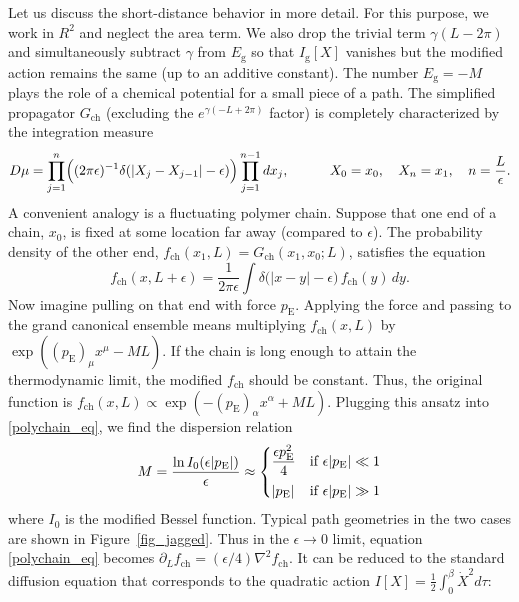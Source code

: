 \documentclass[11pt]{article}
\newcommand{\RR}{\mathbb{R}}
\newcommand{\ch}{\text{ch}}
\newcommand{\g}{\text{g}}
\newcommand{\Euc}{\mathrm{E}}
\def\RR{R}
\begin{document}
Let us discuss the short-distance behavior in more detail. For this purpose, we work in $\RR^2$ and neglect the area term. We also drop the trivial term $\gamma(L-2\pi)$ and simultaneously subtract $\gamma$ from $E_{\g}$ so that $I_{\g}[X]$ vanishes but the modified action remains the same (up to an additive constant). The number $E_{\g}=-M$ plays the role of a chemical potential for a small piece of a path. The simplified propagator $G_{\ch}$ (excluding the $e^{\gamma(-L+2\pi)}$ factor) is completely characterized by the integration measure
\begin{equation}
D\mu=\prod_{j=1}^{n}
\Bigl((2\pi\epsilon)^{-1}\delta(|X_{j}-X_{j-1}|-\epsilon)\Bigr)
\prod_{j=1}^{n-1}dx_j,\qquad\quad
X_0=x_0,\quad X_n=x_1,\quad n=\frac{L}{\epsilon}.
\end{equation}
A convenient analogy is a fluctuating polymer chain. Suppose that one end of a chain, $x_0$, is fixed at some location far away (compared to $\epsilon$). The probability density of the other end, $f_{\ch}(x_1,L)=G_{\ch}(x_1,x_0;L)$, satisfies the equation
\begin{equation}\label{polychain_eq}
f_{\ch}(x,L+\epsilon)=\frac{1}{2\pi\epsilon}
\int\delta\bigl(|x-y|-\epsilon\bigr)\,f_{\ch}(y)\,dy.
\end{equation}
Now imagine pulling on that end with force $p_{\Euc}$. Applying the force and passing to the grand canonical ensemble means multiplying $f_{\ch}(x,L)$ by $\exp((p_{\Euc})_{\mu}x^{\mu}-ML)$. If the chain is long enough to attain the thermodynamic limit, the modified $f_{\ch}$ should be constant. Thus, the original function is $f_{\ch}(x,L)\propto\exp(-(p_{\Euc})_{\alpha}x^{\alpha}+ML)$. Plugging this ansatz into \eqref{polychain_eq}, we find the dispersion relation
\begin{equation}\label{Euc_disp}
M=\frac{\ln I_{0}(\epsilon|p_{\Euc}|)}{\epsilon}
\approx\begin{dcases}
\frac{\epsilon p_{\Euc}^2}{4} & \text{if } \epsilon|p_{\Euc}|\ll 1\\[2pt]
|p_{\Euc}|& \text{if } \epsilon|p_{\Euc}|\gg 1
\end{dcases}
\end{equation}
where $I_0$ is the modified Bessel function. Typical path geometries in the two cases are shown in Figure~\ref{fig_jagged}. Thus in the $\epsilon\to 0$ limit, equation \eqref{polychain_eq} becomes $\partial_{L}f_{\ch}=(\epsilon/4)\nabla^2f_{\ch}$. It can be reduced to the standard diffusion equation that corresponds to the quadratic action $I[X] =\frac{1}{2}\int_{0}^{\beta}\dot{X}^2d\tau$:
\end{document}
